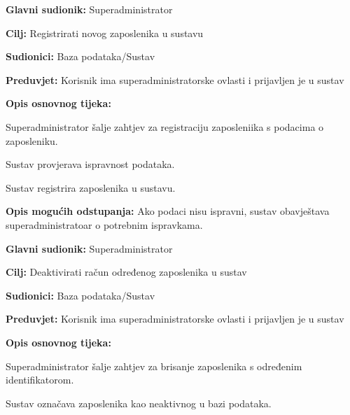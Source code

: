                 \noindent {}
					\begin{packed_item}
	
						\item \textbf{Glavni sudionik: }Superadministrator
						\item  \textbf{Cilj:} Registrirati novog zaposlenika u sustavu
						\item  \textbf{Sudionici:} Baza podataka/Sustav
						\item  \textbf{Preduvjet:} Korisnik ima superadministratorske ovlasti i prijavljen je u sustav
						\item  \textbf{Opis osnovnog tijeka:}
						
						\item[] \begin{packed_enum}
	
							\item Superadministrator šalje zahtjev za registraciju zaposleniika s podacima o zaposleniku.
							\item Sustav provjerava ispravnost podataka.
                            \item Sustav registrira zaposlenika u sustavu.
	
						\end{packed_enum}
						
						\item  \textbf{Opis mogućih odstupanja:} Ako podaci nisu ispravni, sustav obavještava superadministratoar o potrebnim ispravkama.
						
						
					\end{packed_item}

                \noindent {}
					\begin{packed_item}
	
						\item \textbf{Glavni sudionik: }Superadministrator
						\item  \textbf{Cilj:} Deaktivirati račun određenog zaposlenika u sustav
						\item  \textbf{Sudionici:} Baza podataka/Sustav
						\item  \textbf{Preduvjet:} Korisnik ima superadministratorske ovlasti i prijavljen je u sustav
						\item  \textbf{Opis osnovnog tijeka:}
						
						\item[] \begin{packed_enum}
	
							\item Superadministrator šalje zahtjev za brisanje zaposlenika s određenim identifikatorom.
							\item Sustav označava zaposlenika kao neaktivnog u bazi podataka.
	
						\end{packed_enum}
						
						
					\end{packed_item}

